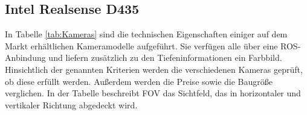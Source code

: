 

\subsection[Intel Realsense D435 (Kopp)]{Intel Realsense D435}

In Tabelle \ref{tab:Kameras} sind die technischen Eigenschaften einiger auf dem Markt erhältlichen Kameramodelle aufgeführt. Sie verfügen alle über eine ROS-Anbindung und liefern zusätzlich zu den Tiefeninformationen ein Farbbild. Hinsichtlich der genannten Kriterien werden die verschiedenen Kameras geprüft, ob diese erfüllt werden. Außerdem werden die Preise sowie die Baugröße verglichen. In der Tabelle beschreibt FOV das Sichtfeld, das in horizontaler und vertikaler Richtung abgedeckt wird. 

